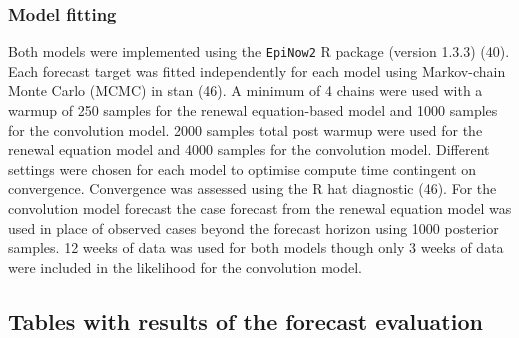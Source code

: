 \documentclass[
]{article}
\begin{document}
\hypertarget{model-fitting}{%
\subsubsection{Model fitting}\label{model-fitting}}

Both models were implemented using the \texttt{EpiNow2} R package (version 1.3.3) (40). Each forecast target was fitted independently for each model using Markov-chain Monte Carlo (MCMC) in stan (46). A minimum of 4 chains were used with a warmup of 250 samples for the renewal equation-based model and 1000 samples for the convolution model. 2000 samples total post warmup were used for the renewal equation model and 4000 samples for the convolution model. Different settings were chosen for each model to optimise compute time contingent on convergence. Convergence was assessed using the R hat diagnostic (46). For the convolution model forecast the case forecast from the renewal equation model was used in place of observed cases beyond the forecast horizon using 1000 posterior samples. 12 weeks of data was used for both models though only 3 weeks of data were included in the likelihood for the convolution model.

\clearpage

\hypertarget{tables-with-results-of-the-forecast-evaluation}{%
\subsection{Tables with results of the forecast evaluation}\label{tables-with-results-of-the-forecast-evaluation}}
\end{document}
